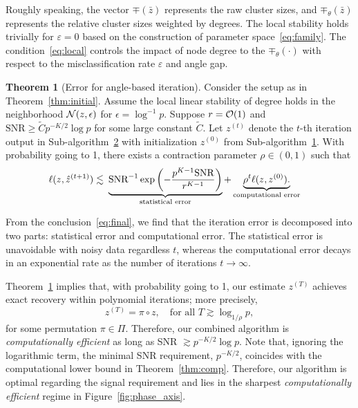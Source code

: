 \documentclass[lettersize,onecolumn,journal]{IEEEtran}
\theoremstyle{definition}
\newtheorem{thm}{Theorem}
\theoremstyle{definition}
\newcommand{\of}[1]{\left(#1\right)}
\newcommand*{\KeepStyleUnderBrace}[1]{%
  \mathop{%
    \mathchoice
    {\underbrace{\displaystyle#1}}%
    {\underbrace{\textstyle#1}}%
    {\underbrace{\scriptstyle#1}}%
    {\underbrace{\scriptscriptstyle#1}}%
  }\limits
}
\begin{document}
Roughly speaking, the vector $\mp(\bar z)$ represents the raw cluster sizes, and $\mp_{\theta}(\bar z)$ represents the relative cluster sizes weighted by degrees. 
The local stability holds trivially for $\varepsilon=0$ based on the construction of parameter space~\eqref{eq:family}. The condition~\eqref{eq:local} controls the impact of node degree to the $\mp_{\theta}(\cdot)$ with respect to the misclassification rate $\varepsilon$ and angle gap.
 
\begin{thm}[Error for angle-based iteration]\label{thm:refinement} Consider the setup as in Theorem~\ref{thm:initial}. Assume the local linear stability of degree holds in the neighborhood $\mathcal{N}(z,\epsilon)$ for $\epsilon = \log^{-1}p$. Suppose 
$r=\mathcal{O}(1)$ and $\text{SNR} \geq \tilde C p^{-K/2}\log p$ for some large constant $\tilde C$. Let $z^{(t)}$ denote the $t$-th iteration output in Sub-algorithm~\hyperref[alg:main]{2} with initialization $z^{(0)}$ from Sub-algorithm~\hyperref[alg:main]{1}. With probability going to 1, there exists a contraction parameter $\rho \in (0,1)$ such that 
\begin{align}\label{eq:final}
    \ell(z, \hat z^{(t+1)}) \lesssim &\ \KeepStyleUnderBrace{
   \text{SNR}^{-1}
    \exp\of{- \frac{p^{K-1}\text{SNR}}{r^{K-1}}}}_{\substack{\text{statistical error}} }+ \KeepStyleUnderBrace{ \rho^t \ell(z, z^{(0)}). }_{\substack{\text{computational error}}}
\end{align}
\end{thm}
From the conclusion~\eqref{eq:final}, we find that the iteration error is decomposed into two parts: statistical error and computational error. The statistical error is unavoidable with noisy data regardless $t$, whereas the computational error decays in an exponential rate as the number of iterations $t \rightarrow \infty$. 

Theorem~\ref{thm:refinement} implies that, with probability going to 1, our estimate $z^{(T)}$ achieves exact recovery within polynomial iterations; more precisely,
\begin{equation}
     z^{(T)} = \pi \circ z, \quad \text{for all }T\gtrsim \log_{1/\rho} p,
\end{equation}
for some permutation $\pi \in \Pi$. Therefore, our combined algorithm is \textit{computationally efficient} as long as SNR $\gtrsim p^{-K/2} \log p$. Note that, ignoring the logarithmic term, the minimal SNR requirement, $p^{-K/2}$, coincides with the computational lower bound in Theorem~\ref{thm:comp}. Therefore, our algorithm is optimal regarding the signal requirement and lies in the sharpest \emph{computationally efficient} regime in Figure~\ref{fig:phase_axis}.
\end{document}
